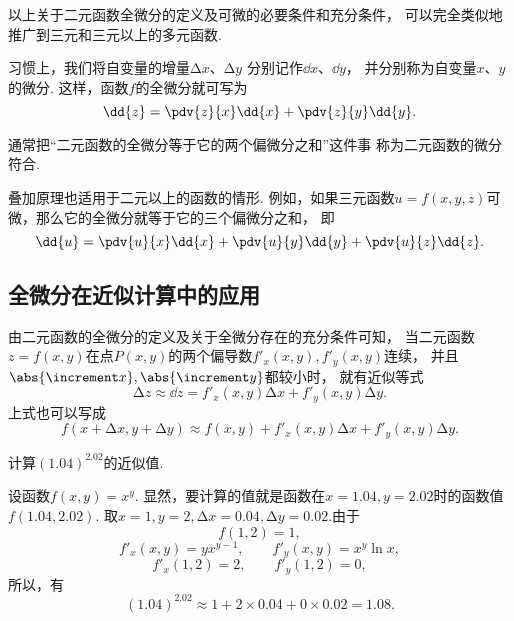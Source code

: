 以上关于二元函数全微分的定义及可微的必要条件和充分条件，
可以完全类似地推广到三元和三元以上的多元函数.

习惯上，我们将自变量的增量\(\increment x\)、\(\increment y\)
分别记作\(\dd{x}\)、\(\dd{y}\)，
并分别称为自变量\(x\)、\(y\)的微分.
这样，函数\(f\)的全微分就可写为\begin{equation*}
	\dd{z}=\pdv{z}{x}\dd{x}+\pdv{z}{y}\dd{y}.
\end{equation*}

通常把“二元函数的全微分等于它的两个偏微分之和”这件事
称为二元函数的微分符合.

叠加原理也适用于二元以上的函数的情形.
例如，如果三元函数\(u = f(x,y,z)\)可微，那么它的全微分就等于它的三个偏微分之和，
即\begin{equation*}
	\dd{u} = \pdv{u}{x} \dd{x} + \pdv{u}{y} \dd{y} + \pdv{u}{z} \dd{z}.
\end{equation*}

\subsection{全微分在近似计算中的应用}
由二元函数的全微分的定义及关于全微分存在的充分条件可知，
当二元函数\(z = f(x,y)\)在点\(P(x,y)\)的两个偏导数\(f'_x(x,y),f'_y(x,y)\)连续，
并且\(\abs{\increment x},\abs{\increment y}\)都较小时，
就有近似等式\begin{equation*}
	\increment z \approx \dd{z} = f'_x(x,y) \increment x + f'_y(x,y) \increment y.
\end{equation*}
上式也可以写成\begin{equation*}
	f(x+\increment x,y+\increment y) \approx f(x,y) + f'_x(x,y) \increment x + f'_y(x,y) \increment y.
\end{equation*}

\begin{example}
计算\((1.04)^{2.02}\)的近似值.
\begin{solution}
设函数\(f(x,y) = x^y\).
显然，要计算的值就是函数在\(x=1.04,y=2.02\)时的函数值\(f(1.04,2.02)\).
取\(x=1,y=2,\increment x=0.04,\increment y=0.02\).由于\begin{equation*}
	f(1,2)=1,
\end{equation*}\begin{equation*}
	f'_x(x,y) = y x^{y-1}, \qquad f'_y(x,y) = x^y \ln x,
\end{equation*}\begin{equation*}
	f'_x(1,2) = 2, \qquad f'_y(1,2) = 0,
\end{equation*}
所以，有\begin{equation*}
	(1.04)^{2.02} \approx 1 + 2 \times 0.04 + 0 \times 0.02 = 1.08.
\end{equation*}
\end{solution}
\end{example}
